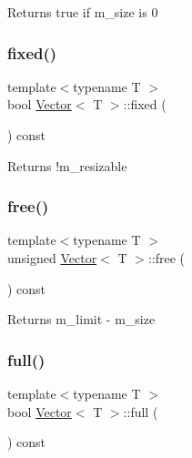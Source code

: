 \begin{DoxyReturn}{Returns}
true if m\+\_\+size is 0 
\end{DoxyReturn}
\mbox{\label{classVector_ada65b076d4102d21479cdb00fec6b6a1}} 
\subsubsection{\texorpdfstring{fixed()}{fixed()}}
{\footnotesize\ttfamily template$<$typename T $>$ \\
bool \hyperlink{classVector}{Vector}$<$ T $>$\+::fixed (\begin{DoxyParamCaption}{ }\end{DoxyParamCaption}) const}

\begin{DoxyReturn}{Returns}
!m\+\_\+resizable 
\end{DoxyReturn}
\mbox{\label{classVector_a1c11aef701f6eb3194946594d064af09}} 
\subsubsection{\texorpdfstring{free()}{free()}}
{\footnotesize\ttfamily template$<$typename T $>$ \\
unsigned \hyperlink{classVector}{Vector}$<$ T $>$\+::free (\begin{DoxyParamCaption}{ }\end{DoxyParamCaption}) const}

\begin{DoxyReturn}{Returns}
m\+\_\+limit -\/ m\+\_\+size 
\end{DoxyReturn}
\mbox{\label{classVector_a31a67e97a324510bff15ea79c64839af}} 
\subsubsection{\texorpdfstring{full()}{full()}}
{\footnotesize\ttfamily template$<$typename T $>$ \\
bool \hyperlink{classVector}{Vector}$<$ T $>$\+::full (\begin{DoxyParamCaption}{ }\end{DoxyParamCaption}) const}

